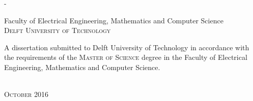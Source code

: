 \begin{titlingpage}
\begin{SingleSpace}
\begin{adjustwidth*}{\unitlength}{-\unitlength}
\begin{center}
\vspace{6mm}
{\large Faculty of Electrical Engineering, Mathematics and Computer Science\\
\textsc{Delft University of Technology}}\\
\vspace{11mm}
\begin{minipage}{10cm}
A dissertation submitted to Delft University of Technology in accordance with the requirements of the \textsc{Master of Science} degree in the Faculty of Electrical Engineering, Mathematics and Computer Science.
\end{minipage}\\
\vspace{9mm}
{\large\textsc{October 2016}}
\vspace{12mm}
\end{center}
\begin{flushright}
\end{flushright}
\end{adjustwidth*}
\end{SingleSpace}
\end{titlingpage}